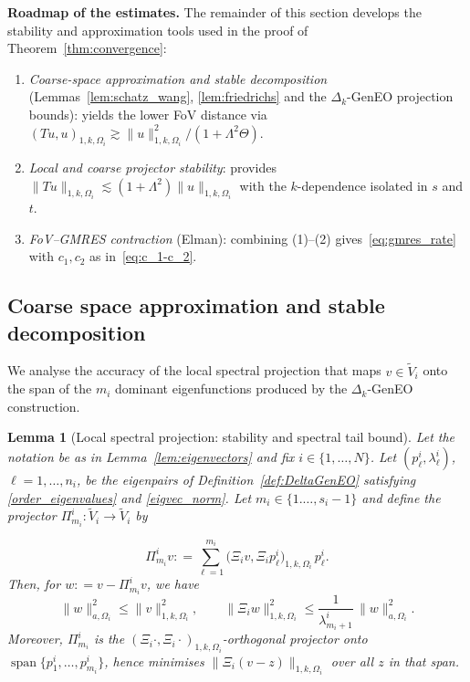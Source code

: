 \documentclass[preprint,3p,times]{elsarticle}
\newcommand{\assign}{\mathrel{\mathop:}=}
\newtheorem{lemma}[theorem]{Lemma}
\theoremstyle{definition}
\numberwithin{equation}{section}
\begin{document}
\medskip
\noindent\textbf{Roadmap of the estimates.}
The remainder of this section develops the stability and approximation tools used in the proof of Theorem~\ref{thm:convergence}:
\begin{enumerate}
\item 
	\emph{Coarse-space approximation and stable decomposition} 
	(Lemmas~\ref{lem:schatz_wang}, \ref{lem:friedrichs} and the $\Delta_k$-GenEO projection bounds): 
	yields the lower FoV distance via $(Tu,u)_{1, k, \Omega_i}\gtrsim \|u\|_{1, k, \Omega_i}^2/(1+\Lambda^2\Theta)$.
\item 
	\emph{Local and coarse projector stability}: 
	provides $\|Tu\|_{1, k, \Omega_i} \lesssim (1+\Lambda^2)\|u\|_{1, k, \Omega_i}$ with the $k$-dependence isolated in $s$ and $t$.
\item
	\emph{FoV--GMRES contraction} (Elman): 
	combining (1)--(2) gives~\eqref{eq:gmres_rate} with $c_1,c_2$ as in~\eqref{eq:c_1-c_2}.
\end{enumerate}


\subsection{Coarse space approximation and stable decomposition}

We analyse the accuracy of the local spectral projection that maps $v\in \widetilde V_i$ 
onto the span of the $m_i$ dominant eigenfunctions produced by the $\Delta_k$-GenEO construction.

\begin{lemma}[Local spectral projection: stability and spectral tail bound]
\label{lem:local-proj}
Let the notation be as in Lemma~\ref{lem:eigenvectors} and fix $i\in\{1,\dots,N\}$.  
Let $(p_\ell^i,\lambda_\ell^i)$, $\ell=1,\ldots,n_i$, 
be the eigenpairs of Definition~\ref{def:DeltaGenEO} satisfying \eqref{order_eigenvalues} and \eqref{eigvec_norm}.
Let $m_i\in\{1.\ldots,s_i-1\}$ and define the projector $\Pi_{m_i}^i:\widetilde{V}_i \to\widetilde{V}_i$ by

\begin{equation}\label{eq:Pi-def}
	\Pi_{m_i}^i v \assign \sum_{\ell=1}^{m_i} \bigl(\Xi_i v,\Xi_i p_\ell^i\bigr)_{1,k,\Omega_i}\,p_\ell^i.
\end{equation}
Then, for $w\assign v-\Pi_{m_i}^i v$, we have
\begin{equation}\label{eq:local-bounds}
	\|w\|_{{a,\Omega_i}}^2 \le \|v\|_{1,k,\Omega_i}^2,
	\qquad
	\|\Xi_i w\|_{1,k,\Omega_i}^2 \le \frac{1}{\lambda_{m_i+1}^i}\,\|w\|_{{a,\Omega_i}}^2.
\end{equation}
Moreover, $\Pi_{m_i}^i$ is the $(\Xi_i\cdot,\Xi_i\cdot)_{1, k, \Omega_i}$-orthogonal projector onto $\operatorname{span}\{p_1^i,\dots,p_{m_i}^i\}$, 
hence minimises $\|\Xi_i(v-z)\|_{1, k, \Omega_i}$ over all $z$ in that span.
\end{lemma}
\end{document}
